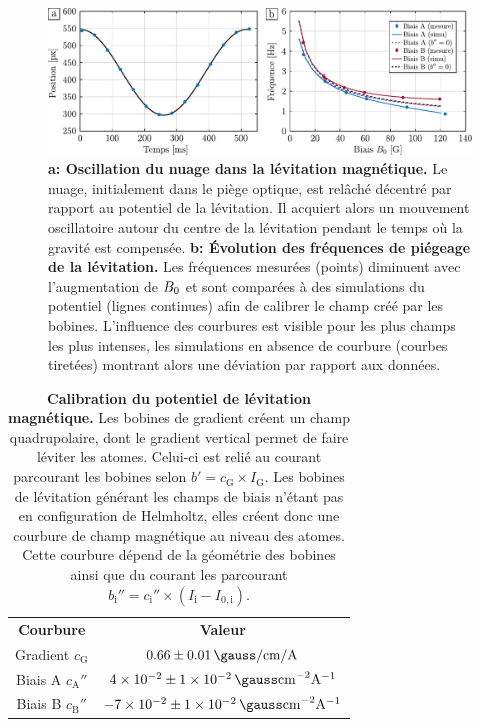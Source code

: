 \begin{figure}
\centering
\includegraphics[width=\textwidth]{Fig/Modif_exp/oscillation_levitation.pdf}
\caption{\textbf{a: Oscillation du nuage dans la lévitation magnétique.} Le nuage, initialement dans le piège optique, est relâché décentré par rapport au potentiel de la lévitation. Il acquiert alors un mouvement oscillatoire autour du centre de la lévitation pendant le temps où la gravité est compensée. \textbf{b: \'Evolution des fréquences de piégeage de la lévitation.} Les fréquences mesurées (points) diminuent avec l'augmentation de $B_0$ et sont comparées à des simulations du potentiel (lignes continues) afin de calibrer le champ créé par les bobines. L'influence des courbures est visible pour les plus champs les plus intenses, les simulations en absence de courbure (courbes tiretées) montrant alors une déviation par rapport aux données.}
\label{fig:frequences_levitation}
\end{figure}


\begin{table}[!h]
\begin{center}
{
\begin{tabular}{ c|c }
{\color{MainColor} \textbf{Courbure}} & {\color{MainColor} \textbf{Valeur}} \\
Gradient $c_{\mathrm{G}}$ & $0.66\pm\SI{0.01}{\gauss\per\centi\metre\per\ampere}$ \\
Biais A $c_{\mathrm{A}}''$ & $\SI{4e-2}{}\pm\SI{1e-2}{\gauss\centi\metre^{-2}\ampere^{-1}}$ \\
Biais B $c_{\mathrm{B}}''$ & $\SI{-7e-2}{}\pm\SI{1e-2}{\gauss\centi\metre^{-2}\ampere^{-1}}$ \\
\end{tabular}}
\end{center}
\caption{\textbf{Calibration du potentiel de lévitation magnétique.} Les bobines de gradient créent un champ quadrupolaire, dont le gradient vertical permet de faire léviter les atomes. Celui-ci est relié au courant parcourant les bobines selon $b'=c_{\mathrm{G}}\times I_{\mathrm{G}}$. Les bobines de lévitation générant les champs de biais n'étant pas en configuration de Helmholtz, elles créent donc une courbure de champ magnétique au niveau des atomes. Cette courbure dépend de la géométrie des bobines ainsi que du courant les parcourant $b_{\mathrm{i}}''= c_{\mathrm{i}}'' \times (I_{\mathrm{i}}-I_{\mathrm{0,i}})$.}
\label{tb:courbures_levitation}
\end{table}


